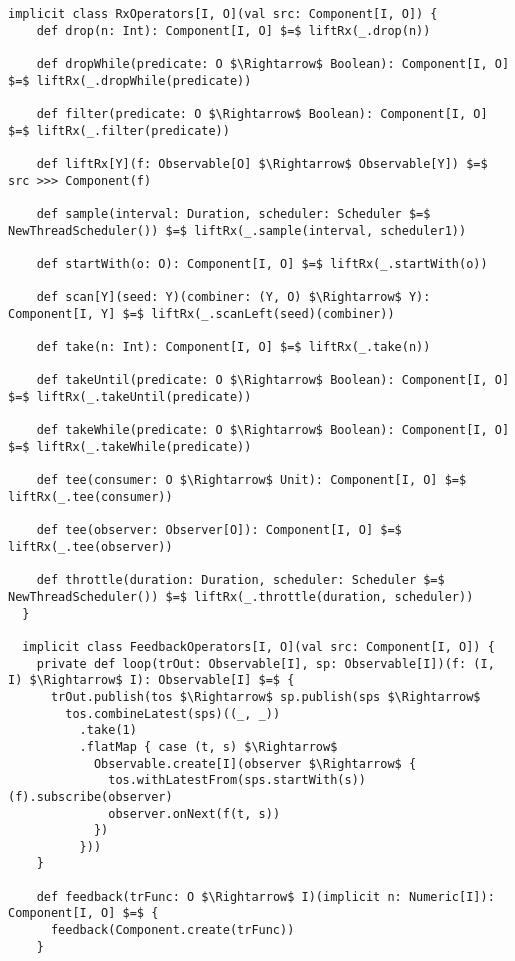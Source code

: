 \begin{lstlisting}[style=ScalaStyle, caption={Operators on \comp}, label={lst:component-operators}]
  implicit class RxOperators[I, O](val src: Component[I, O]) {
    def drop(n: Int): Component[I, O] $=$ liftRx(_.drop(n))

    def dropWhile(predicate: O $\Rightarrow$ Boolean): Component[I, O] $=$ liftRx(_.dropWhile(predicate))

    def filter(predicate: O $\Rightarrow$ Boolean): Component[I, O] $=$ liftRx(_.filter(predicate))

    def liftRx[Y](f: Observable[O] $\Rightarrow$ Observable[Y]) $=$ src >>> Component(f)

    def sample(interval: Duration, scheduler: Scheduler $=$ NewThreadScheduler()) $=$ liftRx(_.sample(interval, scheduler1))

    def startWith(o: O): Component[I, O] $=$ liftRx(_.startWith(o))

    def scan[Y](seed: Y)(combiner: (Y, O) $\Rightarrow$ Y): Component[I, Y] $=$ liftRx(_.scanLeft(seed)(combiner))

    def take(n: Int): Component[I, O] $=$ liftRx(_.take(n))

    def takeUntil(predicate: O $\Rightarrow$ Boolean): Component[I, O] $=$ liftRx(_.takeUntil(predicate))

    def takeWhile(predicate: O $\Rightarrow$ Boolean): Component[I, O] $=$ liftRx(_.takeWhile(predicate))

    def tee(consumer: O $\Rightarrow$ Unit): Component[I, O] $=$ liftRx(_.tee(consumer))

    def tee(observer: Observer[O]): Component[I, O] $=$ liftRx(_.tee(observer))

    def throttle(duration: Duration, scheduler: Scheduler $=$ NewThreadScheduler()) $=$ liftRx(_.throttle(duration, scheduler))
  }
  
  implicit class FeedbackOperators[I, O](val src: Component[I, O]) {
    private def loop(trOut: Observable[I], sp: Observable[I])(f: (I, I) $\Rightarrow$ I): Observable[I] $=$ {
      trOut.publish(tos $\Rightarrow$ sp.publish(sps $\Rightarrow$
        tos.combineLatest(sps)((_, _))
          .take(1)
          .flatMap { case (t, s) $\Rightarrow$
            Observable.create[I](observer $\Rightarrow$ {
              tos.withLatestFrom(sps.startWith(s))(f).subscribe(observer)
              observer.onNext(f(t, s))
            })
          }))
    }

    def feedback(trFunc: O $\Rightarrow$ I)(implicit n: Numeric[I]): Component[I, O] $=$ {
      feedback(Component.create(trFunc))
    }


\end{lstlisting}
